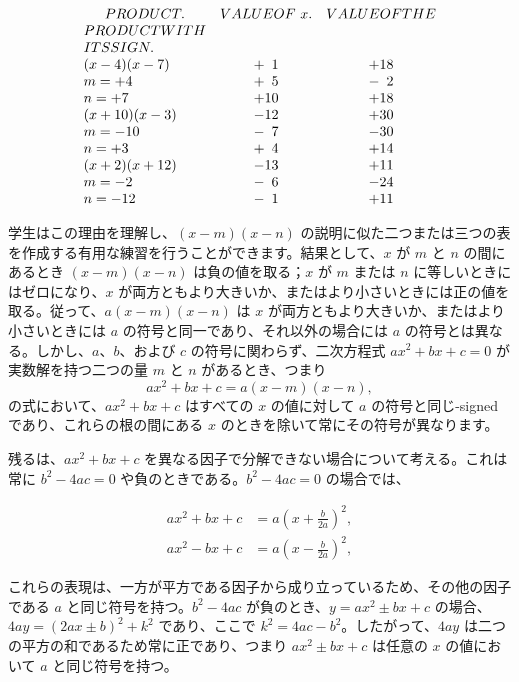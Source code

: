 \documentclass[a4paper,11pt,openany]{ltjsbook}
\newcommand{\TEntry}[2][]{#2}
\newcommand{\Z}{\phantom{0}}
\begin{document}
\begin{table}[hbt!]
\[
\begin{array}{lcc}
\multicolumn{1}{c}{\TEntry{PRODUCT.}} &
\TEntry{VALUE OF~x.} &
\TEntry[PRODUCT WITH]{VALUE OF THE \\ PRODUCT WITH \\ ITS SIGN.} \\
(x - 4)(x - 7) & +\Z1 & + 18 \\
m = +4         & +\Z5 & -\Z2 \\
n = +7         & + 10 & + 18 \\
%
(x + 10)(x - 3) & -12 & + 30 \\
m = -10        & -\Z7 & - 30 \\
n = +3         & +\Z4 & + 14 \\
%
(x + 2)(x + 12) & - 13 & + 11 \\
m = -2          & -\Z6 & - 24 \\
n = -12         & -\Z1 & + 11
\end{array}
\]
\label{table:146}
\end{table}

学生はこの理由を理解し、$(x - m)(x - n)$ の説明に似た二つまたは三つの表を作成する有用な練習を行うことができます。結果として、$x$ が $m$ と $n$ の間にあるとき $(x - m)(x - n)$ は負の値を取る；$x$ が $m$ または $n$ に等しいときにはゼロになり、$x$ が両方ともより大きいか、またはより小さいときには正の値を取る。従って、$a(x - m)(x - n)$ は $x$ が両方ともより大きいか、またはより小さいときには $a$ の符号と同一であり、それ以外の場合には $a$ の符号とは異なる。しかし、$a$、$b$、および $c$ の符号に関わらず、二次方程式 $ax^{2} + bx + c = 0$ が実数解を持つ二つの量 $m$ と $n$ があるとき、つまり
\[
ax^{2} + bx + c = a(x - m)(x - n),
\]
の式において、$ax^{2} + bx + c$ はすべての $x$ の値に対して $a$ の符号と同じ-signed であり、これらの根の間にある $x$ のときを除いて常にその符号が異なります。

残るは、$ax^{2} + bx + c$ を異なる因子で分解できない場合について考える。これは常に $b^{2} - 4ac = 0$ や負のときである。$b^{2} - 4ac = 0$ の場合では、

\begin{align*}
ax^{2} + bx + c &= a\left(x + \frac{b}{2a}\right)^{2}, \\
ax^{2} - bx + c &= a\left(x - \frac{b}{2a}\right)^{2},
\end{align*}

これらの表現は、一方が平方である因子から成り立っているため、その他の因子である $a$ と同じ符号を持つ。$b^{2} - 4ac$ が負のとき、$y = ax^{2} \pm bx + c$ の場合、$4ay = (2ax \pm b)^{2} + k^{2}$ であり、ここで $k^{2} = 4ac - b^{2}$。したがって、$4ay$ は二つの平方の和であるため常に正であり、つまり $ax^{2} \pm bx + c$ は任意の $x$ の値において $a$ と同じ符号を持つ。
\end{document}
